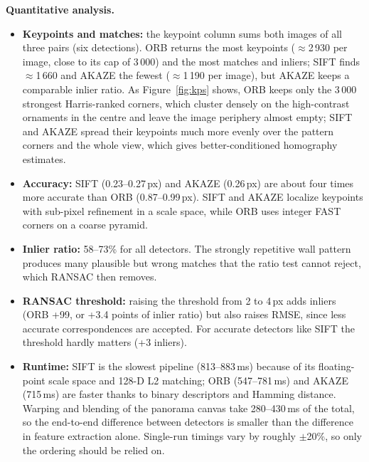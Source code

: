 \documentclass[a4paper,12pt]{article}
\begin{document}
\textbf{Quantitative analysis.}
\begin{itemize}[leftmargin=*]
    \item \textbf{Keypoints and matches:} the keypoint column sums both images of all three pairs
          (six detections). ORB returns the most keypoints ($\approx$2\,930 per image, close to its cap
          of 3\,000) and the most matches and inliers; SIFT finds $\approx$1\,660 and AKAZE the fewest
          ($\approx$1\,190 per image), but AKAZE keeps a comparable inlier ratio. As
          Figure~\ref{fig:kps} shows, ORB keeps only the 3\,000 strongest Harris-ranked corners, which
          cluster densely on the high-contrast ornaments in the centre and leave the image periphery
          almost empty; SIFT and AKAZE spread their keypoints much more evenly over the pattern
          corners and the whole view, which gives better-conditioned homography estimates.
    \item \textbf{Accuracy:} SIFT (0.23--0.27\,px) and AKAZE (0.26\,px) are about four times more accurate
          than ORB (0.87--0.99\,px). SIFT and AKAZE localize keypoints with sub-pixel refinement in a
          scale space, while ORB uses integer FAST corners on a coarse pyramid.
    \item \textbf{Inlier ratio:} 58--73\% for all detectors. The strongly repetitive wall pattern
          produces many plausible but wrong matches that the ratio test cannot reject, which RANSAC
          then removes.
    \item \textbf{RANSAC threshold:} raising the threshold from 2 to 4\,px adds inliers (ORB +99, or
          +3.4 points of inlier ratio) but also raises RMSE, since less accurate correspondences are
          accepted. For accurate detectors like SIFT the threshold hardly matters (+3 inliers).
    \item \textbf{Runtime:} SIFT is the slowest pipeline (813--883\,ms) because of its floating-point
          scale space and 128-D L2 matching; ORB (547--781\,ms) and AKAZE (715\,ms) are faster thanks
          to binary descriptors and Hamming distance. Warping and blending of the panorama canvas
          take 280--430\,ms of the total, so the end-to-end difference between detectors is smaller
          than the difference in feature extraction alone. Single-run timings vary by roughly
          $\pm$20\%, so only the ordering should be relied on.
\end{itemize}
\end{document}
